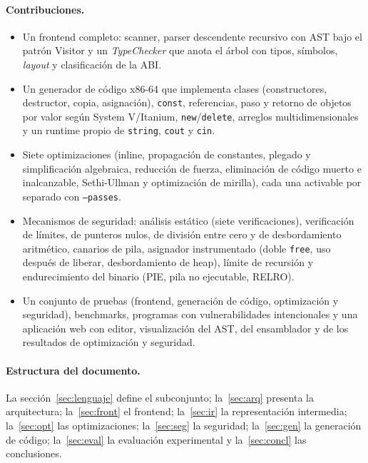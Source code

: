 \documentclass[11pt,a4paper]{article}
\newcommand{\cod}[1]{\texttt{#1}}
\begin{document}
\paragraph{Contribuciones.}
\begin{itemize}
  \item Un frontend completo: scanner, parser descendente recursivo con AST bajo el patrón Visitor y un
        \emph{TypeChecker} que anota el árbol con tipos, símbolos, \emph{layout} y clasificación de la ABI.
  \item Un generador de código x86-64 que implementa clases (constructores, destructor, copia, asignación),
        \cod{const}, referencias, paso y retorno de objetos por valor según System V/Itanium, \cod{new}/\cod{delete},
        arreglos multidimensionales y un runtime propio de \cod{string}, \cod{cout} y \cod{cin}.
  \item Siete optimizaciones (inline, propagación de constantes, plegado y simplificación algebraica, reducción
        de fuerza, eliminación de código muerto e inalcanzable, Sethi-Ullman y optimización de mirilla), cada una
        activable por separado con \cod{--passes}.
  \item Mecanismos de seguridad: análisis estático (siete verificaciones), verificación de límites, de punteros
        nulos, de división entre cero y de desbordamiento aritmético, canarios de pila, asignador instrumentado
        (doble \cod{free}, uso después de liberar, desbordamiento de heap), límite de recursión y endurecimiento
        del binario (PIE, pila no ejecutable, RELRO).
  \item Un conjunto de pruebas (frontend, generación de código, optimización y seguridad), benchmarks, programas
        con vulnerabilidades intencionales y una aplicación web con editor, visualización del AST, del
        ensamblador y de los resultados de optimización y seguridad.
\end{itemize}

\paragraph{Estructura del documento.} La sección~\ref{sec:lenguaje} define el subconjunto; la~\ref{sec:arq}
presenta la arquitectura; la~\ref{sec:front} el frontend; la~\ref{sec:ir} la representación intermedia; la~\ref{sec:opt}
las optimizaciones; la~\ref{sec:seg} la seguridad; la~\ref{sec:gen} la generación de código; la~\ref{sec:eval} la
evaluación experimental y la~\ref{sec:concl} las conclusiones.
\end{document}
